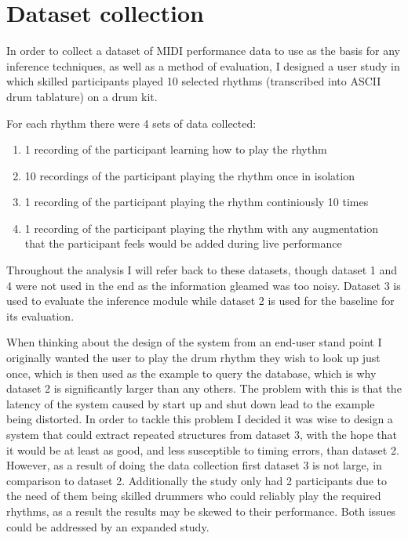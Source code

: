 \documentclass[12pt,twoside,notitlepage]{report}
\begin{document}
	
\section{Dataset collection}\label{sec:Eval Dataset}
	In order to collect a dataset of MIDI performance data to use as the basis for any inference techniques, as well as a method of evaluation, I designed a user study in which skilled participants played 10 selected rhythms (transcribed into ASCII drum tablature) on a drum kit.
	
	For each rhythm there were 4 sets of data collected:
	\begin{enumerate}
		\item{1 recording of the participant learning how to play the rhythm}
		\item{10 recordings of the participant playing the rhythm once in isolation}
		\item{1 recording of the participant playing the rhythm continiously 10 times}
		\item{1 recording of the participant playing the rhythm with any augmentation that the participant feels would be added during live performance}
\end{enumerate}	 

	Throughout the analysis I will refer back to these datasets, though dataset 1 and 4 were not used in the end as the information gleamed was too noisy. Dataset 3 is used to evaluate the inference module while dataset 2 is used for the baseline for its evaluation.
	
	
	When thinking about the design of the system from an end-user stand point I originally wanted the user to play the drum rhythm they wish to look up just once, which is then used as the example to query the database, which is why dataset 2 is significantly larger than any others. The problem with this is that the latency of the system caused by start up and shut down lead to the example being distorted. In order to tackle this problem I decided it was wise to design a system that could extract repeated structures from dataset 3, with the hope that it would be at least as good, and less susceptible to timing errors, than dataset 2. However, as a result of doing the data collection first dataset 3 is not large, in comparison to dataset 2. Additionally the study only had 2 participants due to the need of them being skilled drummers who could reliably play the required rhythms, as a result the results may be skewed to their performance. Both issues could be addressed by an expanded study.
	
\end{document}
